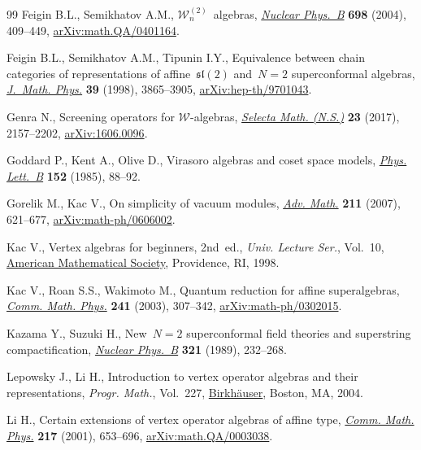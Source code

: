 \documentclass[pdftex]{sigma}
\numberwithin{equation}{section}
\begin{document}
\begin{thebibliography}{99}
Feigin B.L., Semikhatov A.M., {$\mathcal W^{(2)}_n$}~algebras,
 \href{https://doi.org/10.1016/j.nuclphysb.2004.06.056}{\textit{Nuclear
 Phys.~B}} \textbf{698} (2004), 409--449,
 \href{http://arxiv.org/abs/math.QA/0401164}{arXiv:math.QA/0401164}.

Feigin B.L., Semikhatov A.M., Tipunin I.Y., Equivalence between chain
 categories of representations of affine~{$\mathfrak{sl}(2)$} and~{$N=2$}
 superconformal algebras,
 \href{https://doi.org/10.1063/1.532473}{\textit{J.~Math. Phys.}} \textbf{39}
 (1998), 3865--3905,
 \href{http://arxiv.org/abs/hep-th/9701043}{arXiv:hep-th/9701043}.

Genra N., Screening operators for {$\mathcal{W}$}-algebras,
 \href{https://doi.org/10.1007/s00029-017-0315-9}{\textit{Selecta Math.
 (N.S.)}} \textbf{23} (2017), 2157--2202,
 \href{http://arxiv.org/abs/1606.0096}{arXiv:1606.0096}.

Goddard P., Kent A., Olive D., Virasoro algebras and coset space models,
 \href{https://doi.org/10.1016/0370-2693(85)91145-1}{\textit{Phys. Lett.~B}}
 \textbf{152} (1985), 88--92.

Gorelik M., Kac V., On simplicity of vacuum modules,
 \href{https://doi.org/10.1016/j.aim.2006.09.004}{\textit{Adv. Math.}}
 \textbf{211} (2007), 621--677,
 \href{http://arxiv.org/abs/math-ph/0606002}{arXiv:math-ph/0606002}.

Kac V., Vertex algebras for beginners, 2nd~ed., \textit{Univ. Lecture Ser.}, Vol.~10, \href{https://doi.org/10.1090/ulect/010}{American Mathematical Society}, Providence, RI, 1998.

Kac V., Roan S.S., Wakimoto M., Quantum reduction for affine superalgebras,
 \href{https://doi.org/10.1007/s00220-003-0926-1}{\textit{Comm. Math. Phys.}}
 \textbf{241} (2003), 307--342,
 \href{http://arxiv.org/abs/math-ph/0302015}{arXiv:math-ph/0302015}.

Kazama Y., Suzuki H., New~{$N=2$} superconformal field theories and superstring
 compactification,
 \href{https://doi.org/10.1016/0550-3213(89)90250-2}{\textit{Nuclear Phys.~B}}
 \textbf{321} (1989), 232--268.

Lepowsky J., Li H., Introduction to vertex operator algebras and their
 representations, \textit{Progr. Math.}, Vol.~227,
 \href{https://doi.org/10.1007/978-0-8176-8186-9}{Birkh\"auser}, Boston, MA,
 2004.

Li H., Certain extensions of vertex operator algebras of affine type,
 \href{https://doi.org/10.1007/s002200100386}{\textit{Comm. Math. Phys.}}
 \textbf{217} (2001), 653--696,
 \href{http://arxiv.org/abs/math.QA/0003038}{arXiv:math.QA/0003038}.


\end{thebibliography}
\end{document}
